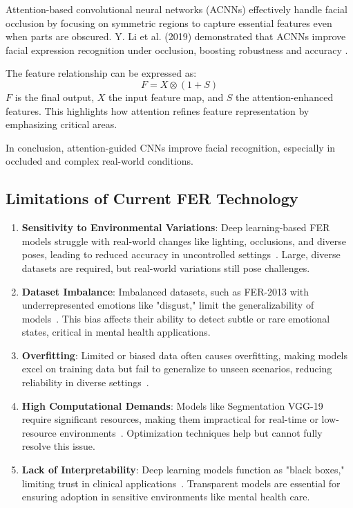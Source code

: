 \documentclass[lettersize,journal]{IEEEtran}
\begin{document}
Attention-based convolutional neural networks (ACNNs) effectively handle facial occlusion by focusing on symmetric regions to capture essential features even when parts are obscured. Y. Li et al. (2019) demonstrated that ACNNs improve facial expression recognition under occlusion, boosting robustness and accuracy \cite{Li2019}.

The feature relationship can be expressed as:
\[
F = X \otimes (1 + S)
\]
\( F \) is the final output, \( X \) the input feature map, and \( S \) the attention-enhanced features. This highlights how attention refines feature representation by emphasizing critical areas.

In conclusion, attention-guided CNNs improve facial recognition, especially in occluded and complex real-world conditions.

\subsection*{Limitations of Current FER Technology}

\begin{enumerate}
    \item \textbf{Sensitivity to Environmental Variations}: Deep learning-based FER models struggle with real-world changes like lighting, occlusions, and diverse poses, leading to reduced accuracy in uncontrolled settings~\cite{Dada2023, Vignesh2023}. Large, diverse datasets are required, but real-world variations still pose challenges.
    
    \item \textbf{Dataset Imbalance}: Imbalanced datasets, such as FER-2013 with underrepresented emotions like "disgust," limit the generalizability of models~\cite{Vignesh2023}. This bias affects their ability to detect subtle or rare emotional states, critical in mental health applications.
    
    \item \textbf{Overfitting}: Limited or biased data often causes overfitting, making models excel on training data but fail to generalize to unseen scenarios, reducing reliability in diverse settings~\cite{Dada2023}.
    
    \item \textbf{High Computational Demands}: Models like Segmentation VGG-19 require significant resources, making them impractical for real-time or low-resource environments~\cite{Vignesh2023}. Optimization techniques help but cannot fully resolve this issue.
    
    \item \textbf{Lack of Interpretability}: Deep learning models function as "black boxes," limiting trust in clinical applications~\cite{Dada2023}. Transparent models are essential for ensuring adoption in sensitive environments like mental health care.
\end{enumerate}
\end{document}
